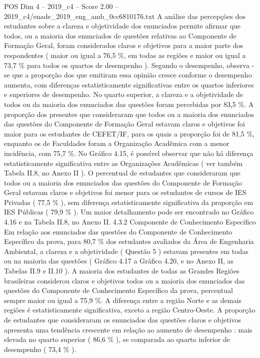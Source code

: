 \begin{textsample}{POS Dim 4 – 2019\_c4 – Score 2.00 – 2019\_c4/enade\_2019\_eng\_amb\_0cc6810176.txt}
A análise das percepções dos estudantes sobre a clareza e objetividade dos enunciados permite afirmar que todos, ou a maioria dos enunciados de questões relativas ao Componente de Formação Geral, foram considerados claros e objetivos para a maior parte dos respondentes ( maior ou igual a 76,5 \%, em todas as regiões e maior ou igual a 73,7 \% para todos os quartos de desempenho ).
Segundo o desempenho, observa -se que a proporção dos que emitiram essa opinião cresce conforme o desempenho aumenta, com diferenças estatisticamente significativas entre os quartos inferiores e superiores de desempenho.
No quarto superior, a clareza e a objetividade de todos ou da maioria dos enunciados das questões foram percebidas por 83,5 \%.
A proporção dos presentes que consideraram que todos ou a maioria dos enunciados das questões do Componente de Formação Geral estavam claros e objetivos foi maior para os estudantes de CEFET/IF, para os quais a proporção foi de 81,5 \%, enquanto os de Faculdades foram a Organização Acadêmica com a menor incidência, com 75,7 \%.
No Gráfico 4.15, é possível observar que não há diferença estatisticamente significativa entre as Organizações Acadêmicas ( ver também Tabela II.8, no Anexo II ).
O percentual de estudantes que consideraram que todos ou a maioria dos enunciados das questões do Componente de Formação Geral estavam claros e objetivos foi menor para os estudantes de cursos de IES Privadas ( 77,5 \% ), sem diferença estatisticamente significativa da proporção em IES Públicas ( 79,9 \% ).
Um maior detalhamento pode ser encontrado no Gráfico 4.16 e na Tabela II.8, no Anexo II. 4.3.2 Componente de Conhecimento Específico Em relação aos enunciados das questões do Componente de Conhecimento Específico da prova, para 80,7 \% dos estudantes avaliados da Área de Engenharia Ambiental, a clareza e a objetividade ( Questão 5 ) estavam presentes em todas ou na maioria das questões ( Gráfico 4.17 a Gráfico 4.20, e no Anexo II, as Tabelas II.9 e II.10 ).
A maioria dos estudantes de todas as Grandes Regiões brasileiras considerou claros e objetivos todos ou a maioria dos enunciados das questões do Componente de Conhecimento Específico da prova, percentual sempre maior ou igual a 75,9 \%.
A diferença entre a região Norte e as demais regiões é estatisticamente significativa, exceto a região Centro-Oeste.
A proporção de estudantes que consideraram os enunciados das questões claros e objetivos apresenta uma tendência crescente em relação ao aumento de desempenho : mais elevada no quarto superior ( 86,6 \% ), se comparada ao quarto inferior de desempenho ( 73,4 \% ).

\end{textsample}
